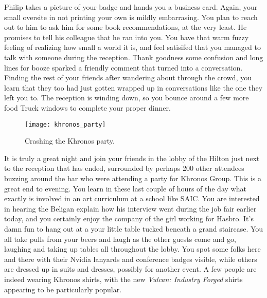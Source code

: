 \documentclass[../main.tex]{subfiles}
\begin{document}
Philip takes a picture of your badge and hands you a business card. Again, your small oversite in not printing your own is mildly embarrasing. You plan to reach out to him to ask him for some book recommendations, at the very least. He promises to tell his colleague that he ran into you. You have that warm fuzzy feeling of realizing how small a world it is, and feel satisifed that you managed to talk with someone during the reception. Thank goodness some confusion and long lines for booze sparked a friendly comment that turned into a conversation. Finding the rest of your friends after wandering about through the crowd, you learn that they too had just gotten wrapped up in conversations like the one they left you to. The reception is winding down, so you bounce around a few more food Truck windows to complete your proper dinner.

\begin{figure}[h!]
	\centering
	\texttt{[image: khronos\_party]}
	\caption*{Crashing the Khronos party.}
\end{figure}

It is truly a great night and join your friends in the lobby of the Hilton just next to the reception that has ended, surrounded by perhaps 200 other attendees buzzing around the bar who were attending a party for Khronos Group. This is a great end to evening. You learn in these last couple of hours of the day what exactly is involved in an art curriculum at a school like SAIC. You are interested in hearing the Beligan explain how his interview went during the job fair earlier today, and you certainly enjoy the company of the girl working for Hasbro. It's damn fun to hang out at a your little table tucked beneath a grand staircase. You all take pulls from your beers and laugh as the other guests come and go, laughing and taking up tables all throughout the lobby. You spot some folks here and there with their Nvidia lanyards and conference badges visible, while others are dressed up in suits and dresses, possibly for another event. A few people are indeed wearing Khronos shirts, with the new \textit{Vulcan: Industry Forged} shirts appearing to be particularly popular. 
\end{document}
